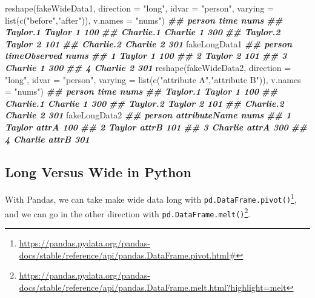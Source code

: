 \documentclass[
  12pt,
  krantz2]{krantz}
\makeatletter
\newenvironment{Shaded}{\begin{snugshade}}{\end{snugshade}}
\newcommand{\AttributeTok}[1]{\textcolor[rgb]{0.61,0.61,0.61}{#1}}
\newcommand{\DocumentationTok}[1]{\textcolor[rgb]{0.37,0.37,0.37}{\textbf{\textit{#1}}}}
\newcommand{\FunctionTok}[1]{\textcolor[rgb]{0,0,0}{#1}}
\newcommand{\NormalTok}[1]{#1}
\newcommand{\StringTok}[1]{\textcolor[rgb]{0.5,0.5,0.5}{#1}}
\renewcommand{\href}[2]{#2\footnote{\url{#1}}}
\newenvironment{kframe}{%
\medskip{}
\setlength{\fboxsep}{.8em}
 \def\at@end@of@kframe{}%
 \ifinner\ifhmode%
  \def\at@end@of@kframe{\end{minipage}}%
  \begin{minipage}{\columnwidth}%
 \fi\fi%
 \def\FrameCommand##1{\hskip\@totalleftmargin \hskip-\fboxsep
 \colorbox{shadecolor}{##1}\hskip-\fboxsep
     \hskip-\linewidth \hskip-\@totalleftmargin \hskip\columnwidth}%
 \MakeFramed {\advance\hsize-\width
   \@totalleftmargin\z@ \linewidth\hsize
   \@setminipage}}%
 {\par\unskip\endMakeFramed%
 \at@end@of@kframe}
\renewenvironment{Shaded}{\begin{kframe}}{\end{kframe}}
\makeatother
\begin{document}
\begin{Shaded}
\begin{Highlighting}[]
\FunctionTok{reshape}\NormalTok{(fakeWideData1, }
        \AttributeTok{direction =} \StringTok{"long"}\NormalTok{,}
        \AttributeTok{idvar =} \StringTok{"person"}\NormalTok{, }
        \AttributeTok{varying =} \FunctionTok{list}\NormalTok{(}\FunctionTok{c}\NormalTok{(}\StringTok{"before"}\NormalTok{,}\StringTok{"after"}\NormalTok{)),}
        \AttributeTok{v.names =} \StringTok{"nums"}\NormalTok{)}
\DocumentationTok{\#\#            person time nums}
\DocumentationTok{\#\# Taylor.1   Taylor    1  100}
\DocumentationTok{\#\# Charlie.1 Charlie    1  300}
\DocumentationTok{\#\# Taylor.2   Taylor    2  101}
\DocumentationTok{\#\# Charlie.2 Charlie    2  301}
\NormalTok{fakeLongData1}
\DocumentationTok{\#\#    person timeObserved nums}
\DocumentationTok{\#\# 1  Taylor            1  100}
\DocumentationTok{\#\# 2  Taylor            2  101}
\DocumentationTok{\#\# 3 Charlie            1  300}
\DocumentationTok{\#\# 4 Charlie            2  301}
\FunctionTok{reshape}\NormalTok{(fakeWideData2, }
        \AttributeTok{direction =} \StringTok{"long"}\NormalTok{,}
        \AttributeTok{idvar =} \StringTok{"person"}\NormalTok{, }
        \AttributeTok{varying =} \FunctionTok{list}\NormalTok{(}\FunctionTok{c}\NormalTok{(}\StringTok{"attribute A"}\NormalTok{,}\StringTok{"attribute B"}\NormalTok{)),}
        \AttributeTok{v.names =} \StringTok{"nums"}\NormalTok{)}
\DocumentationTok{\#\#            person time nums}
\DocumentationTok{\#\# Taylor.1   Taylor    1  100}
\DocumentationTok{\#\# Charlie.1 Charlie    1  300}
\DocumentationTok{\#\# Taylor.2   Taylor    2  101}
\DocumentationTok{\#\# Charlie.2 Charlie    2  301}
\NormalTok{fakeLongData2}
\DocumentationTok{\#\#    person attributeName nums}
\DocumentationTok{\#\# 1  Taylor         attrA  100}
\DocumentationTok{\#\# 2  Taylor         attrB  101}
\DocumentationTok{\#\# 3 Charlie         attrA  300}
\DocumentationTok{\#\# 4 Charlie         attrB  301}
\end{Highlighting}
\end{Shaded}

\hypertarget{long-versus-wide-in-python}{%
\subsection{Long Versus Wide in Python}\label{long-versus-wide-in-python}}

With Pandas, we can take make wide data long with \href{https://pandas.pydata.org/pandas-docs/stable/reference/api/pandas.DataFrame.pivot.html\#}{\texttt{pd.DataFrame.pivot()}}, and we can go in the other direction with \href{https://pandas.pydata.org/pandas-docs/stable/reference/api/pandas.DataFrame.melt.html?highlight=melt}{\texttt{pd.DataFrame.melt()}}.
\end{document}
